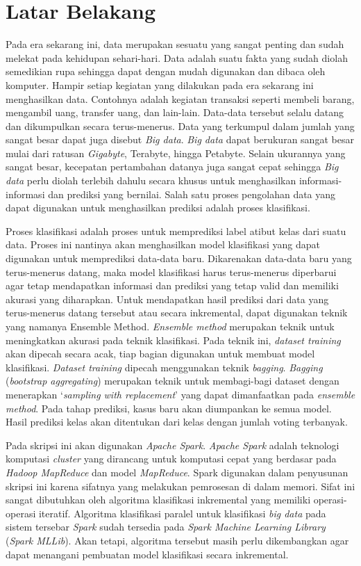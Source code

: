 \documentclass[a4paper,twoside]{article}
\begin{document}
\section{Latar Belakang}
\label{sec:label}
Pada era sekarang ini, data merupakan sesuatu yang sangat penting dan sudah melekat pada kehidupan sehari-hari. Data adalah suatu fakta yang sudah diolah semedikian rupa sehingga dapat dengan mudah digunakan dan dibaca oleh komputer. Hampir setiap kegiatan yang dilakukan pada era sekarang ini menghasilkan data. Contohnya adalah kegiatan transaksi seperti membeli barang, mengambil uang, transfer uang, dan lain-lain. Data-data tersebut selalu datang dan dikumpulkan secara terus-menerus. Data yang terkumpul dalam jumlah yang sangat besar dapat juga disebut \textit{Big data}. \textit{Big data} dapat berukuran sangat besar mulai dari ratusan \textit{Gigabyte}, Terabyte, hingga Petabyte. Selain ukurannya yang sangat besar, kecepatan pertambahan datanya juga sangat cepat sehingga \textit{Big data} perlu diolah terlebih dahulu secara khusus untuk menghasilkan informasi-informasi dan prediksi yang bernilai. Salah satu proses pengolahan data yang dapat digunakan untuk menghasilkan prediksi adalah proses klasifikasi. 

Proses klasifikasi adalah proses untuk memprediksi label atibut kelas dari suatu data. Proses ini nantinya akan menghasilkan model klasifikasi yang dapat digunakan untuk memprediksi data-data baru. Dikarenakan data-data baru yang terus-menerus datang, maka model klasifikasi harus terus-menerus diperbarui agar tetap mendapatkan informasi dan prediksi yang tetap valid dan memiliki akurasi yang diharapkan. Untuk mendapatkan hasil prediksi dari data yang terus-menerus datang tersebut atau secara inkremental, dapat digunakan teknik yang namanya Ensemble Method. \textit{Ensemble method} merupakan teknik untuk meningkatkan akurasi pada teknik klasifikasi. Pada teknik ini, \textit{dataset training} akan dipecah secara acak, tiap bagian digunakan untuk membuat model klasifikasi. \textit{Dataset training} dipecah menggunakan teknik \textit{bagging}. \textit{Bagging} (\textit{bootstrap aggregating}) merupakan teknik untuk membagi-bagi dataset dengan menerapkan ‘\textit{sampling with replacement}’ yang dapat dimanfaatkan pada \textit{ensemble method}. Pada tahap prediksi, kasus baru akan diumpankan ke semua model. Hasil prediksi kelas akan ditentukan dari kelas dengan jumlah voting terbanyak.

Pada skripsi ini akan digunakan \textit{Apache Spark}. \textit{Apache Spark} adalah teknologi komputasi \textit{cluster} yang dirancang untuk komputasi cepat yang berdasar pada \textit{Hadoop MapReduce}  dan model \textit{MapReduce}. Spark digunakan dalam penyusunan skripsi ini karena sifatnya yang melakukan pemrosesan di dalam memori. Sifat ini sangat dibutuhkan oleh algoritma klasifikasi inkremental yang memiliki operasi-operasi iteratif. Algoritma klasifikasi paralel untuk klasifikasi \textit{big data} pada sistem tersebar \textit{Spark} sudah tersedia pada \textit{Spark Machine Learning Library} (\textit{Spark MLLib}). Akan tetapi, algoritma tersebut masih perlu dikembangkan agar dapat menangani pembuatan model klasifikasi secara inkremental.
\end{document}
